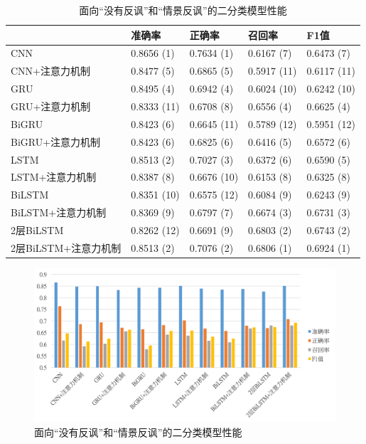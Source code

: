 \begin{table}[htb]
  \centering
  \begin{minipage}[t]{\linewidth}
  \caption{面向“没有反讽”和“情景反讽”的二分类模型性能}
  \label{tab:exp_irony_det_Bb02_result}
    \begin{tabularx}{\linewidth}{X|llll}
    \toprule[1.5pt]
    & 准确率 & 正确率 & 召回率 & F1值 \\
    \hline
    CNN & 0.8656 (1) & 0.7634 (1) & 0.6167 (7) & 0.6473 (7) \\ %
    CNN+注意力机制 & 0.8477 (5) & 0.6865 (5) & 0.5917 (11) & 0.6117 (11) \\ %
    \hline
    GRU & 0.8495 (4) & 0.6942 (4) & 0.6024 (10) & 0.6242 (10) \\ %
    GRU+注意力机制 & 0.8333 (11) & 0.6708 (8) & 0.6556 (4) & 0.6625 (4) \\ %
    \hline
    BiGRU & 0.8423 (6) & 0.6645 (11) & 0.5789 (12) & 0.5951 (12) \\ %
    BiGRU+注意力机制 & 0.8423 (6) & 0.6825 (6) & 0.6416 (5) & 0.6572 (6) \\ %
    \hline
    LSTM & 0.8513 (2) & 0.7027 (3) & 0.6372 (6) & 0.6590 (5) \\ %
    LSTM+注意力机制 & 0.8387 (8) & 0.6676 (10) & 0.6153 (8) & 0.6325 (8) \\ %
    \hline
    BiLSTM & 0.8351 (10) & 0.6575 (12) & 0.6084 (9) & 0.6243 (9) \\ %
    BiLSTM+注意力机制 & 0.8369 (9) & 0.6797 (7) & 0.6674 (3) & 0.6731 (3) \\ %
    \hline
    2层BiLSTM & 0.8262 (12) & 0.6691 (9) & 0.6803 (2) & 0.6743 (2) \\ %
    2层BiLSTM+注意力机制 & 0.8513 (2) & 0.7076 (2) & 0.6806 (1) & 0.6924 (1) \\ %
    \bottomrule[1.5pt]
    \end{tabularx}
  \end{minipage}
\end{table}

\begin{figure}[H]
  \centering
  \includegraphics[width=\textwidth]{img/exp_irony_det_Bb02_single_result_bar.png}
  \caption{面向“没有反讽”和“情景反讽”的二分类模型性能}
  \label{fig:exp_irony_det_Bb02_single_result_bar}
\end{figure}

